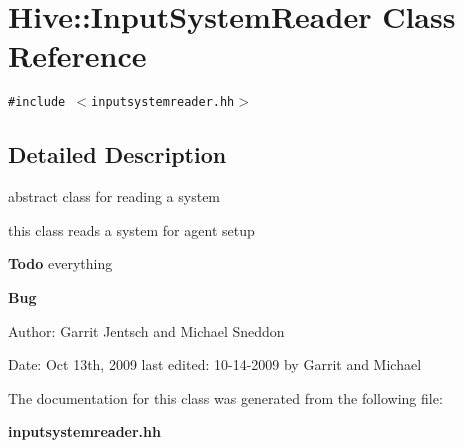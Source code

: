 \section{Hive::InputSystemReader Class Reference}
\label{classHive_1_1InputSystemReader}
{\tt \#include $<$inputsystemreader.hh$>$}



\subsection{Detailed Description}
abstract class for reading a system 

this class reads a system for agent setup

\begin{Desc}
\item[{\bf Todo}]everything\end{Desc}
\begin{Desc}
\item[{\bf Bug}]\end{Desc}
\begin{Desc}
\item[Author:]Garrit Jentsch and Michael Sneddon\end{Desc}
\begin{Desc}
\item[Date:]Oct 13th, 2009 last edited: 10-14-2009 by Garrit and Michael \end{Desc}


The documentation for this class was generated from the following file:\begin{CompactItemize}
\item 
{\bf inputsystemreader.hh}\end{CompactItemize}
